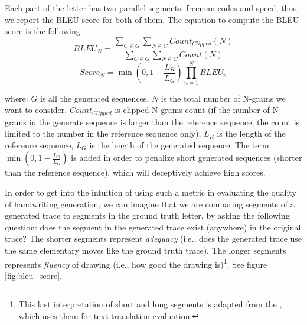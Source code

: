 Each part of the letter has two parallel segments: freeman codes and speed, thus, we report the BLEU score for both of them.
The equation to compute the BLEU score is the following:
\begin{equation}
BLEU_{N} = \frac{\sum_{C\in G}\sum_{N\in C}Count_{Clipped}(N)}{\sum_{C\in G}\sum_{N\in C}Count(N)}
\end{equation}
\begin{equation}
Score_{N} = \min{(0, 1 - \frac{L_{R}}{L_{G}})} \prod^{N}_{n=1}BLEU_{n}
\end{equation}

where: $G$ is all the generated sequences, $N$ is the total number of N-grams we want to consider. $Count_{Clipped}$ is clipped N-grams count (if the number of N-grams in the generate sequence is larger than the reference sequence, the count is limited to the number in the reference sequence only), $L_R$ is the length of the reference sequence, $L_G$ is the length of the generated sequence.
The term $\min(0, 1 - \frac{L_{R}}{L_{G}})$ is added in order to penalize short generated sequences (shorter than the reference sequence), which will deceptively achieve high scores.

\par In order to get into the intuition of using such a metric in evaluating the quality of handwriting generation, we can imagine that we are comparing segments of a generated trace to segments in the ground truth letter, by asking the following question: does the segment in the generated trace exist (anywhere) in the original trace? The shorter segments represent \textit{adequacy} (i.e., does the generated trace use the same elementary moves like the ground truth trace). The longer segments represents \textit{fluency} of drawing (i.e., how good the drawing is)\footnote{This last interpretation of short and long segments is adapted from the \citep{papineni2002bleu}, which uses them for text translation evaluation.}. See figure \ref{fig:bleu_score}.

